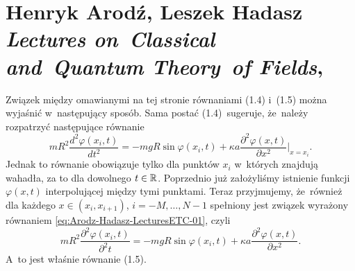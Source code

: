 \documentclass[a4paper,11pt]{article}
\numberwithin{equation}{section}
\begin{document}
\begin{center}
\end{center}

\VerSpaceTwo











\newpage

\section{Henryk Arodź, Leszek Hadasz \textit{Lectures
    on~Classical and~Quantum Theory~of Fields},
  \cite{ArodzHadaszFieldTheory2010} }


\vspace{0em}



\vspace{0em}


\noindent
{} Związek między omawianymi na tej stronie równaniami
(1.4) i~(1.5) można wyjaśnić w~następujący sposób. Sama postać
(1.4)~sugeruje, że~należy rozpatrzyć następujące równanie
\begin{equation}
  \label{eq:Arodz-Hadasz-LecturesETC-01}
  m R^{ 2 } \frac{ d^{ 2 } \varphi( x_{ i }, t ) }{ dt^{ 2 } } =
  -m g R \sin \varphi( x_{ i }, t )
  + \kappa a \frac{ \partial^{ 2 } \varphi( x, t ) }{ \partial x^{ 2 } }\bigg|_{ x = x_{ i } }.
\end{equation}
Jednak to równanie obowiązuje tylko dla punktów $x_{ i }$ w~których
znajdują wahadła, za to dla dowolnego $t \in \mathbb{R}$. Poprzednio już
założyliśmy istnienie funkcji $\varphi( x , t )$ interpolującej między
tymi punktami. Teraz przyjmujemy, że~również dla każdego
$x \in ( x_{ i }, x_{ i + 1 } )$, $i = -M, \ldots, N - 1$ spełniony jest
związek wyrażony równaniem \eqref{eq:Arodz-Hadasz-LecturesETC-01}, czyli
\begin{equation}
  \label{eq:Arodz-Hadasz-LecturesETC-02}
  m R^{ 2 } \frac{ \partial^{ 2 } \varphi( x_{ i }, t ) }{ \partial^{ 2 } t } =
  -m g R \sin \varphi( x_{ i }, t )
  + \kappa a \frac{ \partial^{ 2 } \varphi( x, t ) }{ \partial x^{ 2 } }.
\end{equation}
A~to jest właśnie równanie (1.5).
\end{document}
